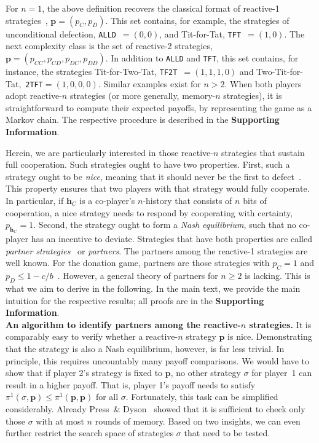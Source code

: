 \documentclass[11pt]{article}
\def\tft{\texttt{TFT}}
\def\tftt{\texttt{TF2T}}
\def\ttft{\texttt{2TFT}}
\def\alld{\texttt{ALLD}}
\def\SI{\textbf{Supporting Information}}
\begin{document}
For \(n\!=\!1\), the above definition recovers the classical format of reactive-1 strategies~\cite{sigmund2010}, \(\mathbf{p}\!=\!(p_C, p_D)\). 
This set contains, for example, the strategies of unconditional defection, \alld~$=\!(0,0)$, and Tit-for-Tat, \tft~$=\!(1,0)$. 
The next complexity class is the set of reactive-2 strategies, $\mathbf{p}\!=\!(p_{CC},p_{CD},p_{DC},p_{DD})$.
In addition to \alld{} and \tft{}, this set contains, for instance, the strategies Tit-for-Two-Tat, \tftt~$=\!(1,1,1,0)$ and Two-Tit-for-Tat,~\ttft$=\!(1,0,0,0)$. 
Similar examples exist for $n\!>\!2$. 
When both players adopt reactive-$n$ strategies (or more generally, memory-$n$ strategies), it is straightforward to compute their expected payoffs, by representing the game as a Markov chain. 
The respective procedure is described in the \SI{}.  

Herein, we are particularly interested in those reactive-$n$ strategies that sustain full cooperation. 
Such strategies ought to have two properties. 
First, such a strategy ought to be {\it nice}, meaning that it should never be the first to defect~\citep{axelrod:AAAS:1981}.
This property ensures that two players with that strategy would fully cooperate. 
In particular, if $\mathbf{h}_C$ is a co-player's $n$-history that consists of $n$ bits of cooperation, a nice strategy needs to respond by cooperating with certainty, $p_{\mathbf{h}_C}\!=\!1$.  
Second, the strategy ought to form a {\it Nash equilibrium}, such that no co-player has an incentive to deviate. 
Strategies that have both properties are called {\it partner strategies}~\citep{Hilbe:GEB:2015} or {\it partners}.
The partners among the reactive-1 strategies are well known. 
For the donation game, partners are those strategies with $p_C\!=\!1$ and $p_D\!\le\!1\!-\!c/b$~\citep{akin:EGADS:2016}. 
However, a general theory of partners for $n\!\ge\!2$ is lacking. 
This is what we aim to derive in the following. 
In the main text, we provide the main intuition for the respective results; all proofs are in the \SI.\\
 
 
 
 
\noindent
\textbf{An algorithm to identify partners among the reactive-$n$ strategies.} 
It is comparably easy to verify whether a reactive-$n$ strategy $\mathbf{p}$ is nice. 
Demonstrating that the strategy is also a Nash equilibrium, however, is far less trivial. 
In principle, this requires uncountably many payoff comparisons. 
We would have to show that if player 2's strategy is fixed to $\mathbf{p}$, no other strategy $\sigma$ for player~1 can result in a higher payoff. That is, player 1's payoff needs to satisfy $\pi^1(\sigma,\mathbf{p})\!\le\!\pi^1(\mathbf{p},\mathbf{p})$ for all $\sigma$. 
Fortunately, this task can be simplified considerably. 
Already Press~\& Dyson~\cite{press:PNAS:2012} showed that it is sufficient to check only those $\sigma$ with at most $n$ rounds of memory. 
Based on two insights, we can even further restrict the search space of strategies $\sigma$ that need to be tested.
\end{document}
